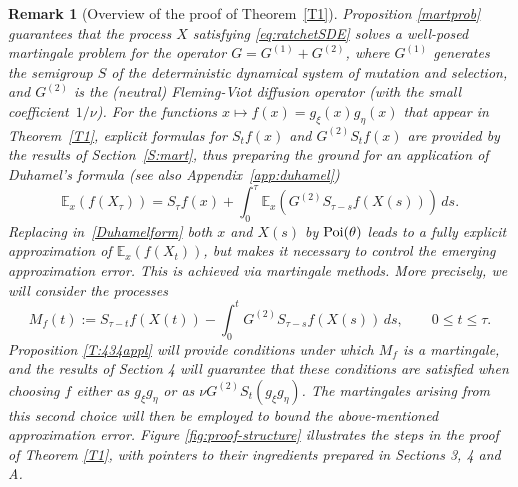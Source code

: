 \documentclass{imsart}
\theoremstyle{plain}
\newtheorem{remark}[theorem]{Remark}
\theoremstyle{definition}
\begin{document}
\begin{remark}[Overview of the proof of Theorem~\ref{T1}]\label{rem:overview}
Proposition \ref{martprob} guarantees that the process $X$ satisfying \eqref{eq:ratchetSDE} solves a well-posed martingale problem for the operator $G = G^{(1)} + G^{(2)}$, where $G^{(1)}$ generates the semigroup $S$ of the  deterministic dynamical system of mutation and selection, and $G^{(2)}$ is the (neutral) Fleming-Viot diffusion operator (with the small coefficient~$1/\nu$).
For the functions $x\mapsto f(x) = g_\xi(x)g_\eta(x)$ that appear in Theorem~\ref{T1},  explicit formulas for $S_tf(x)$ and $G^{(2)}S_tf(x)$ are provided by the results of Section~\ref{S:mart}, thus preparing the ground for an application of Duhamel's formula  (see also Appendix~\ref{app:duhamel})
\begin{equation}\label{Duhamelform}
\mathbb E_x(f(X_\tau)) = S_\tau f(x)+\int_0^\tau \mathbb E_x(G^{(2)}S_{\tau-s}f(X(s)))\, ds. 
\end{equation}
Replacing in~\eqref{Duhamelform}  both $x$ and  $X(s)$ by  $\rm Poi(\theta)$ leads to a fully explicit approximation of $\mathbb E_x(f(X_t))$, but makes it necessary to control the emerging approximation error. This is achieved via martingale methods. More precisely, we will consider the processes 
$$M_f(t) := S_{\tau-t}f(X(t))  - \int_0^t G^{(2)}S_{\tau-s}f(X(s))\, ds, \qquad 0\le t \le \tau.$$
Proposition \ref{T:434appl} will provide conditions under which $M_f$ is a martingale, and the results of Section 4 will guarantee that these conditions are satisfied when choosing $f$ either as $g_\xi g_\eta$ or as $\nu G^{(2)}S_t(g_\xi g_\eta)$. The martingales arising from this second choice will then be employed to bound the above-mentioned approximation error. Figure \ref{fig:proof-structure} illustrates the steps in the proof of Theorem \ref{T1},
with pointers to their ingredients prepared in Sections 3, 4 and A.
\end{remark}
\end{document}
